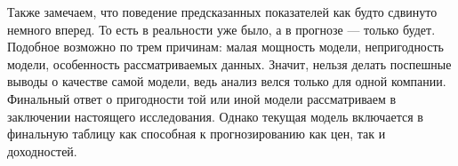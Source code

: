 Также замечаем, что поведение предсказанных показателей как будто сдвинуто немного вперед. То есть в реальности уже было, а в прогнозе --- только будет. Подобное возможно по трем причинам: малая мощность модели, непригодность модели, особенность рассматриваемых данных. Значит, нельзя делать поспешные выводы о качестве самой модели, ведь анализ велся только для одной компании. Финальный ответ о пригодности той или иной модели рассматриваем в заключении настоящего исследования. Однако текущая модель включается в финальную таблицу как способная к прогнозированию как цен, так и доходностей.